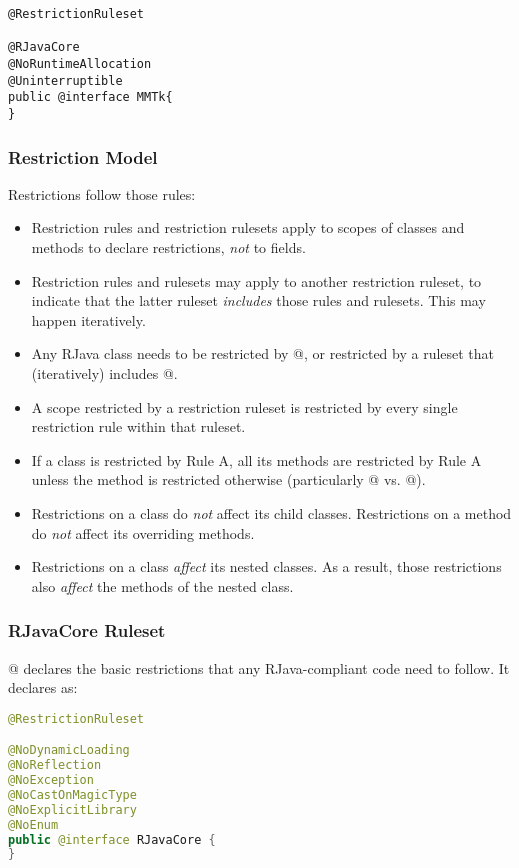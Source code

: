 \documentclass[12pt]{article}
\begin{document}
\begin{lstlisting}
@RestrictionRuleset

@RJavaCore
@NoRuntimeAllocation
@Uninterruptible
public @interface MMTk{
}
\end{lstlisting}

\subsubsection{Restriction Model}
Restrictions follow those rules:

\begin{itemize}

\item 
Restriction rules and restriction rulesets apply to scopes of
classes and methods to declare restrictions, \emph{not} to fields. 
\item
Restriction rules and rulesets may apply to another restriction ruleset,
to indicate that the latter ruleset \emph{includes} those rules and rulesets.
This may happen iteratively. 
\item
Any RJava class needs to be restricted by @, or restricted
by a ruleset that (iteratively) includes @.
\item
A scope restricted by a restriction ruleset is restricted by every single
restriction rule within that ruleset. 
\item
If a class is restricted by Rule A, all its methods are restricted by Rule A 
unless the method is restricted otherwise 
(particularly @ vs. @). 
\item
Restrictions on a class do \emph{not} affect its child classes. Restrictions on a method
do \emph{not} affect its overriding methods. 
\item
Restrictions on a class \emph{affect} its nested classes. As a result, 
those restrictions also \emph{affect} the methods of the nested class. 

\end{itemize}

\subsubsection{RJavaCore Ruleset}

@ declares the basic restrictions that any RJava-compliant code
need to follow. It declares as:

\begin{lstlisting}[language=java]
@RestrictionRuleset

@NoDynamicLoading
@NoReflection
@NoException
@NoCastOnMagicType
@NoExplicitLibrary
@NoEnum
public @interface RJavaCore {
}
\end{lstlisting}
\end{document}
